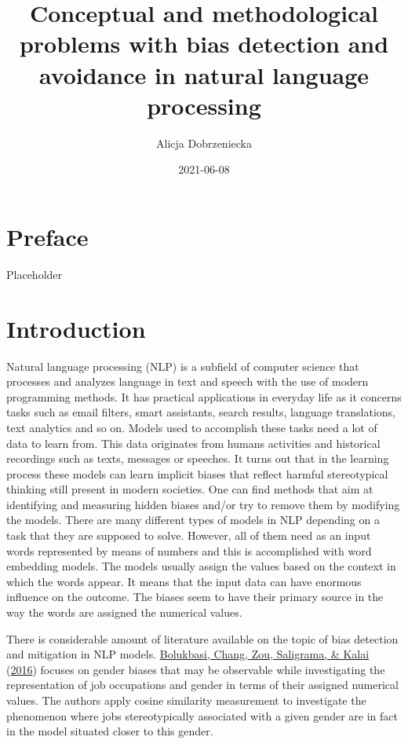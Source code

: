 \documentclass[
]{book}
\title{Conceptual and methodological problems with bias detection and avoidance in natural language processing}
\author{Alicja Dobrzeniecka}
\date{2021-06-08}
\begin{document}
\maketitle

{
\setcounter{tocdepth}{5}
\tableofcontents
}
\hypertarget{preface}{%
\chapter*{Preface}\label{preface}}

Placeholder

\hypertarget{introduction}{%
\chapter{Introduction}\label{introduction}}

Natural language processing (NLP) is a subfield of computer science that processes and analyzes language in text and speech
with the use of modern programming methods. It has practical applications in everyday life as it concerns tasks such as email filters,
smart assistants, search results, language translations, text analytics and so on. Models used to accomplish these tasks need a lot of
data to learn from. This data originates from humans activities and historical recordings such as texts, messages or speeches. It turns out
that in the learning process these models can learn implicit biases that reflect harmful stereotypical thinking still present in modern societies. One can find methods that aim at identifying and measuring hidden biases and/or try to remove them by modifying the models.
There are many different types of models in NLP depending on a task that they are supposed to solve. However, all of them need as an input words represented by means of numbers and this is accomplished with word embedding models. The models usually assign the values based on the context in which the words appear. It means that the input data can have enormous influence on the outcome. The biases seem to have their primary source in the way the words are assigned the numerical values.

There is considerable amount of literature available on the topic of bias detection and mitigation in NLP models. \protect\hyperlink{ref-Bolukbasi2016Man}{Bolukbasi, Chang, Zou, Saligrama, \& Kalai} (\protect\hyperlink{ref-Bolukbasi2016Man}{2016}) focuses on gender biases that may be observable while investigating the representation of job occupations and gender in terms of their assigned numerical
values. The authors apply cosine similarity measurement to investigate the phenomenon where jobs stereotypically associated with a given gender are in fact in the model situated closer to this gender.
\end{document}
